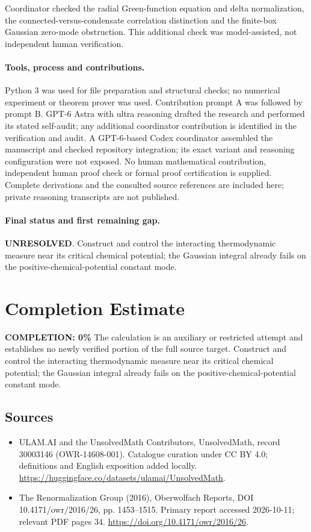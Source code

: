 \documentclass[11pt]{article}
\begin{document}
Coordinator checked the radial Green-function equation and delta normalization, the connected-versus-condensate correlation distinction and the finite-box Gaussian zero-mode obstruction. This additional check was model-assisted, not independent human verification.

\paragraph{Tools, process and contributions.}
Python 3 was used for file preparation and structural checks; no numerical experiment or theorem prover was used. Contribution prompt A was followed by prompt B. GPT-6 Astra with ultra reasoning drafted the research and performed its stated self-audit; any additional coordinator contribution is identified in the verification and audit. A GPT-6-based Codex coordinator assembled the manuscript and checked repository integration; its exact variant and reasoning configuration were not exposed. No human mathematical contribution, independent human proof check or formal proof certification is supplied. Complete derivations and the consulted source references are included here; private reasoning transcripts are not published.

\paragraph{Final status and first remaining gap.}
\textbf{UNRESOLVED}. Construct and control the interacting thermodynamic measure near its critical chemical potential; the Gaussian integral already fails on the positive-chemical-potential constant mode.

\section{Completion Estimate}
\noindent\textbf{COMPLETION: 0\%}
The calculation is an auxiliary or restricted attempt and establishes no newly verified portion of the full source target. Construct and control the interacting thermodynamic measure near its critical chemical potential; the Gaussian integral already fails on the positive-chemical-potential constant mode.

\subsection{Sources}
\begin{itemize}
\item[\hypertarget{source:30003146:1}{S1}] ULAM.AI and the UnsolvedMath Contributors, UnsolvedMath, record 30003146 (OWR-14608-001). Catalogue curation under CC BY 4.0; definitions and English exposition added locally.
\url{https://huggingface.co/datasets/ulamai/UnsolvedMath}.
\item[\hypertarget{source:30003146:2}{S2}] The Renormalization Group (2016), Oberwolfach Reports, DOI 10.4171/owr/2016/26, pp. 1453--1515. Primary report accessed 2026-10-11; relevant PDF pages 34.
\url{https://doi.org/10.4171/owr/2016/26}.
\end{itemize}
\label{end:30003146}
\end{document}
